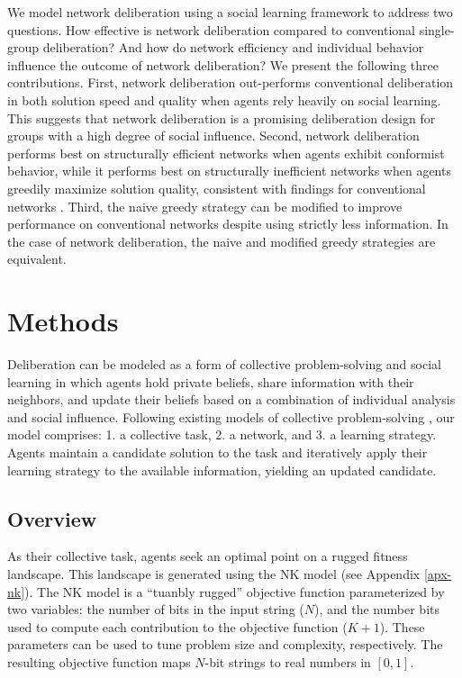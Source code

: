 We model network deliberation using a social learning framework to address two questions. How effective is network deliberation compared to conventional single-group deliberation? And how do network efficiency and individual behavior influence the outcome of network deliberation? We present the following three contributions.
First, network deliberation out-performs conventional deliberation in both solution speed and quality when agents rely heavily on social learning. This suggests that network deliberation is a promising deliberation design for groups with a high degree of social influence. Second, network deliberation performs best on structurally efficient networks when agents exhibit conformist behavior, while it performs best on structurally inefficient networks when agents greedily maximize solution quality, consistent with findings for conventional networks \cite{barkoczi_social_2016}.
Third, the naive greedy strategy can be modified to improve performance on conventional networks despite using strictly less information. In the case of network deliberation, the naive and modified greedy strategies are equivalent.

\section{Methods}

Deliberation can be modeled as a form of collective problem-solving and social learning in which agents hold private beliefs, share information with their neighbors, and update their beliefs based on a combination of individual analysis and social influence.
Following existing models of collective problem-solving \cite{lazer_network_2007, barkoczi_social_2016, gomez_clustering_2019}, our model comprises: 1. a collective task, 2. a network, and 3. a learning strategy.
Agents maintain a candidate solution to the task and iteratively apply their learning strategy to the available information, yielding an updated candidate.

\subsection{Overview}

As their collective task, agents seek an optimal point on a rugged fitness landscape.
This landscape is generated using the NK model \cite{kauffman_towards_1987, weinberger_local_1991} (see Appendix \ref{apx-nk}).
The NK model is a ``tuanbly rugged'' objective function parameterized by two variables:
the number of bits in the input string ($N$),
and the number bits used to compute each contribution to the objective function ($K+1$).
These parameters can be used to tune problem size and complexity, respectively.
The resulting objective function maps $N$-bit strings to real numbers in $[0,1]$.

